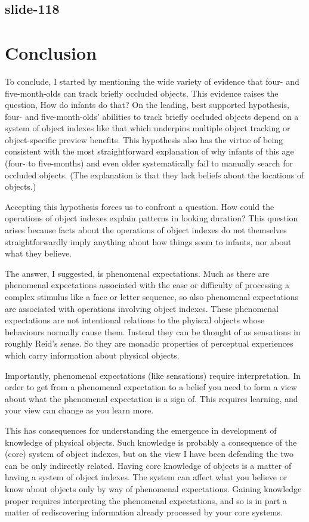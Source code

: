 \documentclass[12pt,\papersize]{extarticle}
\begin{document}
\subsection{slide-118}
\section{Conclusion}

To conclude,
I started by mentioning the wide variety of evidence that
four- and five-month-olds can track briefly occluded objects.
This evidence raises the question, How do infants do that?
On the leading, best supported hypothesis,
four- and five-month-olds’ abilities to track briefly occluded objects
depend on a system of object indexes like that which underpins multiple
object tracking or object-specific preview benefits.
This hypothesis
also has the virtue of being consistent with the most straightforward
explanation of why infants of this age (four- to five-months) and even older
systematically fail to manually search for occluded objects.
(The explanation is that they lack beliefs about the locations of objects.)

Accepting this hypothesis forces us to confront a question.
How could the operations of object indexes explain patterns in looking
duration?
This question arises because
facts about the operations of object indexes do not themselves
straightforwardly imply anything about how things seem to infants, nor about
what they believe.

The answer, I suggested, is phenomenal expectations.
Much as there are phenomenal expectations associated with the ease or
difficulty of processing a complex stimulus like a face or letter sequence,
so also phenomenal expectations are associated with operations involving
object indexes.
These phenomenal expectations are not intentional relations to
the phyiscal objects whose behaviours normally cause them.
Instead they can be thought of as sensations in roughly Reid’s sense.
So they are monadic properties of perceptual experiences which carry
information about physical objects.

Importantly, phenomenal expectations (like sensations) require
interpretation.
In order to get from a phenomenal expectation to a belief you need to
form a view about what the phenomenal expectation is a sign of.
This requires learning, and your view can change as you learn more.

This has consequences for understanding the emergence in
development of knowledge of physical objects.
Such knowledge is probably a consequence of the (core) system of
object indexes, but on the view I have been defending the two can be only
indirectly related.
Having core knowledge of objects is a matter of having a system of object
indexes.
The system can affect what you believe or know about objects only by way
of phenomenal expectations.
Gaining knowledge proper requires interpreting the phenomenal expectations,
and so is in part a matter of rediscovering information already processed
by your core systems.
\end{document}
